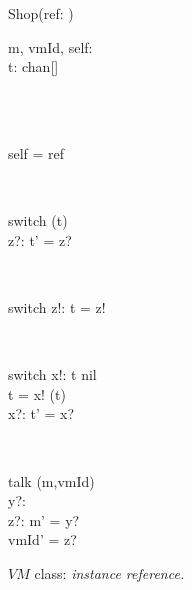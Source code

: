 \begin{figure}[H]
\centering
\begin{class}{Shop(ref: \integer)}
\\
\begin{state}
m, vmId, self: \integer
\\t: chan[\integer \times \integer]
\end{state} 
\\
\begin{init}
\\self = ref
\end{init} 
\\
\begin{op}{switch}
\Delta (t)
\\z?: \integer
\ST
t' = z?
\end{op}
\\
\begin{op}{switch}
z!: \integer
\ST
t = z!
\end{op}
\\
\begin{op}{switch}
x!: \integer
\ST
t \neq nil
\\t = x!
\ST
\ST
\Delta (t)
\\x?: \integer
\ST
t' = x?
\end{op}
\\
\begin{op}{talk}
\Delta (m,vmId)
\\y?: \integer
\\z?: \integer
\ST
m' = y?
\\vmId' = z?
\end{op}
\end{class}
\caption{$VM$ class: \textit{instance reference.}}
\label{oz_unfixed_operation_schema_shop}
\end{figure}